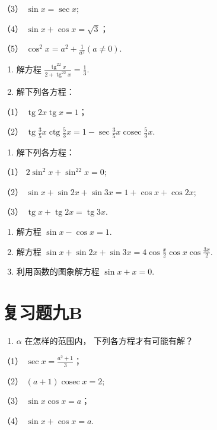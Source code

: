 （3） \(\sin x = \sec x;\)

（4） \(\sin x + \cos x = \sqrt{3}\)；

（5） \(\cos^2 x = a^2 + \frac{1}{a^2} (a \neq 0)\).

\begin{enumerate}[start=2]
\item
  解方程
  \(\frac{\operatorname{tg}^22x}{2 + \operatorname{tg}^22x} = \frac{1}{3}\).
\item
  解下列各方程：
\end{enumerate}

（1） \(\operatorname{tg} 2x \operatorname{tg} x = 1\)；

（2）
\(\operatorname{tg} \frac{3}{5} x \operatorname{ctg} \frac{5}{3} x = 1 - \sec \frac{3}{5} x \operatorname{cosec} \frac{5}{3} x.\)

\begin{enumerate}[start=4]
\item
  解下列各方程：
\end{enumerate}

（1） \(2\sin^2 x + \sin^22x = 0;\)

（2） \(\sin x + \sin 2x + \sin 3x = 1 + \cos x + \cos 2x;\)

（3）
\(\operatorname{tg} x + \operatorname{tg} 2x = \operatorname{tg} 3x.\)

\begin{enumerate}[start=5]
\item
  解方程 \(\sin x - \cos x = 1\).
\item
  解方程
  \(\sin x + \sin 2x + \sin 3x = 4\cos \frac{x}{2}\cos x\cos \frac{3x}{2}\).
\item
  利用函数的图象解方程 \(\sin x + x = 0\).
\end{enumerate}

\section{复习题九B}

\begin{enumerate}
\item
  \(\alpha\) 在怎样的范围内， 下列各方程才有可能有解？
\end{enumerate}

（1） \(\sec x = \frac{a^2 + 1}{3}\)；

（2） \((a + 1)\operatorname{cosec} x = 2;\)

（3） \(\sin x \cos x = a\)；

（4） \(\sin x + \cos x = a\).

